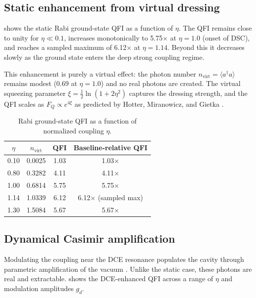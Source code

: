 \documentclass[aps,prxquantum,preprint,superscriptaddress,amsmath,amssymb]{revtex4-2}
\begin{document}
\subsection{Static enhancement from virtual dressing}

 shows the static Rabi ground-state QFI as a function of $\eta$. The QFI remains close to unity for $\eta \ll \num{0.1}$, increases monotonically to \num{5.75}$\times$ at $\eta=\num{1.0}$ (onset of DSC), and reaches a sampled maximum of \num{6.12}$\times$ at $\eta=\num{1.14}$. Beyond this it decreases slowly as the ground state enters the deep strong coupling regime.

This enhancement is purely a virtual effect: the photon number $n_{\text{virt}} = \langle a^\dagger a \rangle$ remains modest ($\num{0.69}$ at $\eta=\num{1.0}$) and no real photons are created. The virtual squeezing parameter $\xi = \frac{1}{2}\ln(1+2\eta^2)$ captures the dressing strength, and the QFI scales as $F_Q \propto e^{4\xi}$ as predicted by Hotter, Miranowicz, and Gietka \cite{Hotter2025}.

\begin{table}[hbt!]
\centering
\caption{Rabi ground-state QFI as a function of normalized coupling $\eta$.}
\label{tab:trackB_usc_scaling}
\begin{tabular}{c c c c}
\toprule{$\eta$} & {$n_{\text{virt}}$} & {QFI} & {Baseline-relative QFI} \\\midrule
\num{0.10} & \num{0.0025} & \num{1.03} & \num{1.03}$\times$ \\
\num{0.80} & \num{0.3282} & \num{4.11} & \num{4.11}$\times$ \\
\num{1.00} & \num{0.6814} & \num{5.75} & \num{5.75}$\times$ \\
\num{1.14} & \num{1.0339} & \num{6.12} & \num{6.12}$\times$ (sampled max) \\
\num{1.30} & \num{1.5084} & \num{5.67} & \num{5.67}$\times$ \\
\bottomrule
\end{tabular}
\end{table}

\subsection{Dynamical Casimir amplification}

Modulating the coupling near the DCE resonance populates the cavity through parametric amplification of the vacuum \cite{Nation2012,Macri2018,Seok2013Mult,Wilson2011}. Unlike the static case, these photons are real and extractable.  shows the DCE-enhanced QFI across a range of $\eta$ and modulation amplitudes $g_d$.
\end{document}
